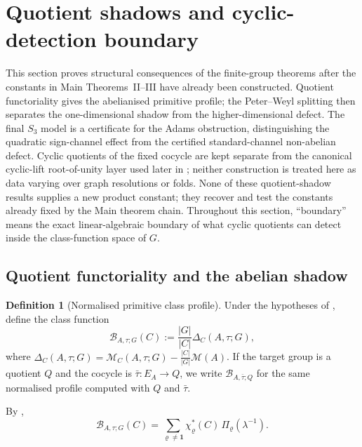 \documentclass[11pt,a4paper]{amsart}
\theoremstyle{plain}
\theoremstyle{definition}
\newtheorem{definition}[theorem]{Definition}
\theoremstyle{remark}
\begin{document}
\section{Quotient shadows and cyclic-detection boundary}
\label{sec:shadows}

This section proves structural consequences of the finite-group
theorems after the constants in Main Theorems~II--III have already been
constructed.  Quotient functoriality gives the abelianised primitive
profile; the Peter--Weyl splitting then separates the one-dimensional
shadow from the higher-dimensional defect. The final \(S_3\) model is a
certificate for the Adams obstruction, distinguishing the quadratic
sign-channel effect from the certified standard-channel non-abelian
defect. Cyclic quotients of the fixed cocycle are kept separate from the
canonical cyclic-lift root-of-unity layer used later in
; neither construction is treated here as data
varying over graph resolutions or folds. None of these quotient-shadow
results supplies a new product constant; they recover and test the
constants already fixed by the Main theorem chain.
Throughout this section, ``boundary'' means the exact linear-algebraic
boundary of what cyclic quotients can detect inside the class-function
space of \(G\).

\subsection{Quotient functoriality and the abelian shadow}

\begin{definition}[Normalised primitive class profile]
  \label{def:normalised-primitive-class-profile}
  Under the hypotheses of , define the
  class function
  \[
    \mathcal B_{A,\tau;G}(C):=\frac{|G|}{|C|}\Delta_C(A,\tau;G),
  \]
  where \(\Delta_C(A,\tau;G)=\mathcal M_C(A,\tau;G)-\frac{|C|}{|G|}\mathcal M(A)\).
  If the target group is a quotient \(Q\) and the cocycle is
  \(\bar\tau:E_A\to Q\), we write
  \(\mathcal B_{A,\bar\tau;Q}\) for the same normalised profile computed
  with \(Q\) and \(\bar\tau\).
\end{definition}

By ,
\begin{equation}\label{eq:normalised-primitive-class-profile}
  \mathcal B_{A,\tau;G}(C)
  =
  \sum_{\varrho\neq \mathbf 1}
    \chi_\varrho^\ast(C)\,\Pi_\varrho(\lambda^{-1}).
\end{equation}
\end{document}
